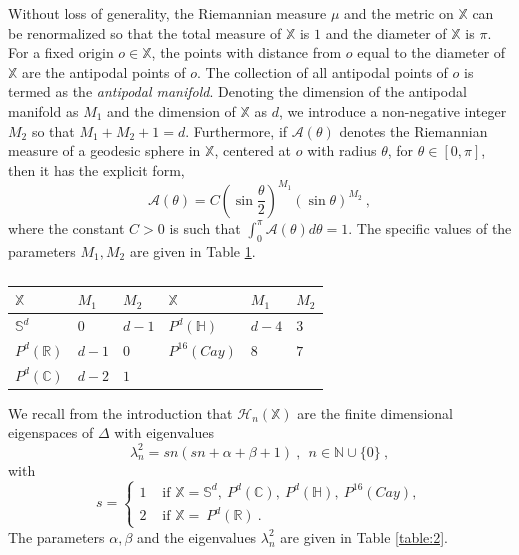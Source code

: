 \documentclass[12pt]{amsart}
\theoremstyle{definition}
\newcommand{\R}{\mathbb R}%
\newcommand{\C}{\mathbb C}%
\newcommand{\N}{\mathbb N}%
\newcommand{\Sb}{\mathbb S}%
\newcommand{\Ac}{\mathcal A}%
\newcommand{\X}{\mathbb X}%
\newcommand{\Hb}{\mathbb H}%
\numberwithin{equation}{section}
\begin{document}
Without loss of generality, the Riemannian measure $\mu$ and the metric on $\X$ can be renormalized so that the total measure of $\X$ is $1$ and the diameter of $\X$ is $\pi$. For a fixed origin $o \in \X$, the points with distance from $o$ equal to the diameter of $\X$ are the antipodal points of $o$. The collection of all antipodal points of $o$ is termed as the {\em antipodal manifold}. Denoting the dimension of the antipodal manifold as $M_1$ and the dimension of $\X$ as $d$, we introduce a non-negative integer $M_2$ so that $M_1+M_2+1=d$. Furthermore, if $\Ac(\theta)$ denotes the Riemannian measure of a geodesic sphere in $\X$, centered at $o$ with radius $\theta$, for $\theta \in [0,\pi]$, then it has the explicit form,
\begin{equation} \label{density}
\Ac(\theta)= C {\left(\sin \frac{\theta}{2}\right)}^{M_1} {(\sin \theta)}^{M_2}\:,
\end{equation}
where the constant $C>0$ is such that $\int_0^\pi \Ac(\theta) d\theta=1$. The specific values of the parameters $M_1,M_2$ are given in Table \ref{table:1}.
 
\begingroup

\setlength{\tabcolsep}{10pt} %
\renewcommand{\arraystretch}{1.5} %
\begin{table}[H]
\centering
\begin{tabular}{ ||p{1.7cm}|| p{1cm} | p{1cm} || p{1.7cm}|| p{1cm} | p{1cm}| }
 \hline
 $\X$ & $M_1$ & $M_2$ & $\X$ & $M_1$ & $M_2$ \\
 \hline 
$\Sb^d$   & $0$   & $d-1$ & $P^d(\Hb)$ & $d-4$ & \:\:$3$  \\
$P^d(\R)$ & $d-1$   & \:\:$0$ & $P^{16}(Cay)$ & \:\:$8$ & \:\:$7$ \\
$P^d(\C)$ & $d-2$  & \:\:$1$ & & &   \\
\hline
\end{tabular}
\medskip
\caption{}
\label{table:1}
\end{table}
\endgroup

We recall from the introduction that $\mathscr{H}_n(\X)$ are the finite dimensional eigenspaces of $\Delta$ with eigenvalues 
\begin{equation} \label{rank1_eigenvalue_form} 
\lambda^2_n =sn(sn+\alpha+\beta+1)\:,\:\:n \in \N \cup \{0\}\:,
\end{equation}  
with 
\begin{equation} \label{value_of_s}
s=\begin{cases}
	 1  &\text{ if }  \X = \Sb^d,\:P^d(\C),\:P^d(\Hb),\:P^{16}(Cay), \\
	2 &\text{ if }  \X = \:P^d(\R) \:.
	\end{cases}	
\end{equation}
The parameters $\alpha, \beta$ and the eigenvalues $\lambda^2_n$ are given in Table \ref{table:2}.
\end{document}
